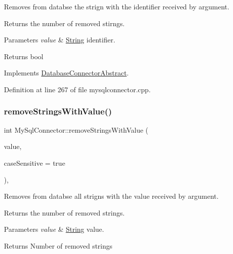 Removes from databse the strign with the identifier received by argument. 

Returns the number of removed stirngs. 
\begin{DoxyParams}{Parameters}
{\em value} & \mbox{\hyperlink{classString}{String}} identifier. \\
\hline
\end{DoxyParams}
\begin{DoxyReturn}{Returns}
bool 
\end{DoxyReturn}


Implements \mbox{\hyperlink{classDatabaseConnectorAbstract_a8c2b0fa4e37d16c1b1ea1cafec166ca0}{Database\+Connector\+Abstract}}.



Definition at line 267 of file mysqlconnector.\+cpp.

\mbox{\label{classMySqlConnector_a528aac591ea56ade27a096bb997abb2a}} 
\subsubsection{\texorpdfstring{remove\+Strings\+With\+Value()}{removeStringsWithValue()}}
{\footnotesize\ttfamily int My\+Sql\+Connector\+::remove\+Strings\+With\+Value (\begin{DoxyParamCaption}\item[{const Q\+String \&}]{value,  }\item[{bool}]{case\+Sensitive = {\ttfamily true} }\end{DoxyParamCaption})\hspace{0.3cm}{\ttfamily [override]}, {\ttfamily [virtual]}}



Removes from databse all strigns with the value received by argument. 

Returns the number of removed strings. 
\begin{DoxyParams}{Parameters}
{\em value} & \mbox{\hyperlink{classString}{String}} value. \\
\hline
\end{DoxyParams}
\begin{DoxyReturn}{Returns}
Number of removed strings 
\end{DoxyReturn}


